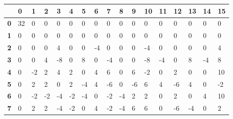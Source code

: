 \begin{longtable}[c]{|l|l|l|l|l|l|l|l|l|l|l|l|l|l|l|l|l|}
\hline
            & \textbf{0} & \textbf{1} & \textbf{2} & \textbf{3} & \textbf{4} & \textbf{5} & \textbf{6} & \textbf{7} & \textbf{8} & \textbf{9} & \textbf{10} & \textbf{11}  & \textbf{12} & \textbf{13} & \textbf{14} & \textbf{15}  \\ \hline
\endfirsthead
%
\endhead
%
\textbf{0}  & 32         & 0          & 0          & 0          & 0          & 0          & 0          & 0          & 0          & 0          & 0           & 0            & 0           & 0           & 0           & 0            \\ \hline
\textbf{1}  & 0          & 0          & 0          & 0          & 0          & 0          & 0          & 0          & 0          & 0          & 0           & 0            & 0           & 0           & 0           & 0            \\ \hline
\textbf{2}  & 0          & 0          & 0          & 4          & 0          & 0          & -4         & 0          & 0          & 0          & -4          & 0            & 0           & 0           & 0           & 4            \\ \hline
\textbf{3}  & 0          & 0          & 4          & -8         & 0          & 8          & 0          & -4         & 0          & 0          & -8          & -4           & 0           & 8           & -4          & 8            \\ \hline
\textbf{4}  & 0          & -2         & 2          & 4          & 2          & 0          & 4          & 6          & 0          & 6          & -2          & 0            & 2           & 0           & 0           & 10           \\ \hline
\textbf{5}  & 0          & 2          & 2          & 0          & 2          & -4         & 4          & -6         & 0          & -6         & 6           & 4            & -6          & 4           & 0           & -2           \\ \hline
\textbf{6}  & 0          & -2         & -2         & -4         & -2         & -4         & 0          & -2         & -4         & 2          & 2           & 0            & 2           & 0           & 4           & 10           \\ \hline
\textbf{7}  & 0          & 2          & 2          & -4         & -2         & 0          & 4          & -2         & -4         & 6          & 6           & 0            & -6          & -4          & 0           & 2            \\ \hline

\end{longtable}

